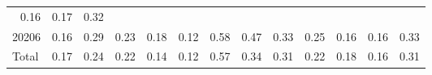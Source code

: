 \begin{table}[!h]
\begin{tabular}{lllllllllllll}
  \multicolumn{1}{r}{0.16} &
  \multicolumn{1}{r}{0.17} &
  \multicolumn{1}{r}{0.32} \\
\multicolumn{1}{l}{\hspace{1em}20206} &
  \multicolumn{1}{|r}{0.16} &
  \multicolumn{1}{r}{0.29} &
  \multicolumn{1}{r}{0.23} &
  \multicolumn{1}{r}{0.18} &
  \multicolumn{1}{r}{0.12} &
  \multicolumn{1}{r}{0.58} &
  \multicolumn{1}{r}{0.47} &
  \multicolumn{1}{r}{0.33} &
  \multicolumn{1}{r}{0.25} &
  \multicolumn{1}{r}{0.16} &
  \multicolumn{1}{r}{0.16} &
  \multicolumn{1}{r}{0.33} \\
\multicolumn{1}{l}{\hspace{1em}Total} &
  \multicolumn{1}{|r}{0.17} &
  \multicolumn{1}{r}{0.24} &
  \multicolumn{1}{r}{0.22} &
  \multicolumn{1}{r}{0.14} &
  \multicolumn{1}{r}{0.12} &
  \multicolumn{1}{r}{0.57} &
  \multicolumn{1}{r}{0.34} &
  \multicolumn{1}{r}{0.31} &
  \multicolumn{1}{r}{0.22} &
  \multicolumn{1}{r}{0.18} &
  \multicolumn{1}{r}{0.16} &
  \multicolumn{1}{r}{0.31} \\
\cline{1-13}
\end{tabular}
\end{table}
